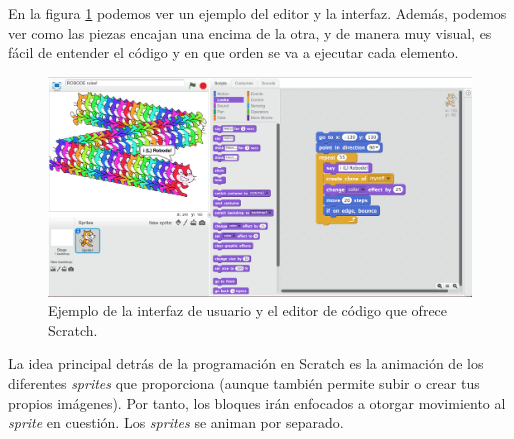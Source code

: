 En la figura \ref{fig:scratch-example} podemos ver un ejemplo del editor y la interfaz. Además, podemos ver como las piezas encajan una encima de la otra, y de manera muy visual, es fácil de entender el código y en que orden se va a ejecutar cada elemento.

\begin{figure}[!ht]
	\begin{centering}
		\includegraphics[width=1\textwidth]{images/scratch-example.png}
			\caption{Ejemplo de la interfaz de usuario y el editor de código que ofrece Scratch.}
				\label{fig:scratch-example}
	\end{centering}
\end{figure}

La idea principal detrás de la programación en Scratch es la animación de los diferentes \emph{sprites} que proporciona (aunque también permite subir o crear tus propios imágenes). Por tanto, los bloques irán enfocados a otorgar movimiento al \emph{sprite} en cuestión. Los \emph{sprites} se animan por separado.

